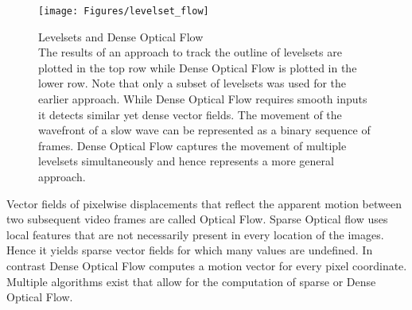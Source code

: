 \begin{figure}[!htb]
\centering
\texttt{[image: Figures/levelset\_flow]}
\decoRule
\caption[Levelsets and Optical Flow]{Levelsets and Dense Optical Flow\\ The results of an approach to track the outline of levelsets are plotted in the top row while Dense Optical Flow is plotted in the lower row. Note that only a subset of levelsets was used for the earlier approach. While Dense Optical Flow requires smooth inputs it detects similar yet dense vector fields. The movement of the wavefront of a slow wave can be represented as a binary sequence of frames. Dense Optical Flow captures the movement of multiple levelsets simultaneously and hence represents a more general approach.}
\label{fig:levelset_flow}
\end{figure}
Vector fields of pixelwise displacements that reflect the apparent motion between two subsequent video frames are called Optical Flow. Sparse Optical flow uses local features that are not necessarily present in every location of the images. Hence it yields sparse vector fields for which many values are undefined. In contrast Dense Optical Flow computes a motion vector for every pixel coordinate. Multiple algorithms exist that allow for the computation of sparse or Dense Optical Flow. \\
